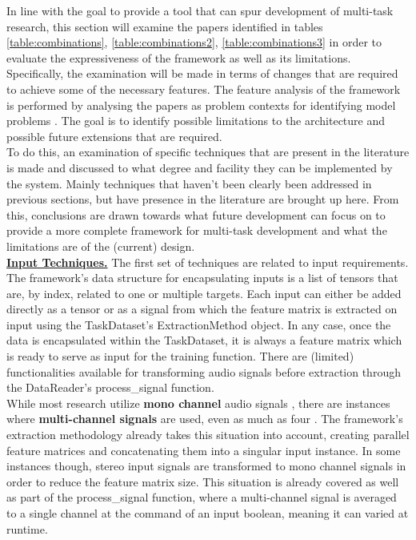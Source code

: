 
In line with the goal to provide a tool that can spur development of multi-task research, this section will examine the papers identified in tables \ref{table:combinations}, \ref{table:combinations2}, \ref{table:combinations3} in order to evaluate the expressiveness of the framework as well as its limitations. Specifically, the examination will be made in terms of changes that are required to achieve some of the necessary features. The feature analysis of the framework is performed by analysing the papers as problem contexts for identifying model problems \citep{brown1996framework}. The goal is to identify possible limitations to the architecture and possible future extensions that are required. \\

To do this, an examination of specific techniques that are present in the literature is made and discussed to what degree and facility they can be implemented by the system. Mainly techniques that haven't been clearly been addressed in previous sections, but have presence in the literature are brought up here. From this, conclusions are drawn towards what future development can focus on to provide a more complete framework for multi-task development and what the limitations are of the (current) design.\\



\underline{\textbf{Input Techniques.}} The first set of techniques are related to input requirements. The framework's data structure for encapsulating inputs is a list of tensors that are, by index, related to one or multiple targets. Each input can either be added directly as a tensor or as a signal from which the feature matrix is extracted on input using the TaskDataset's ExtractionMethod object. In any case, once the data is encapsulated within the TaskDataset, it is always a feature matrix which is ready to serve as input for the training function. There are (limited) functionalities available for transforming audio signals before extraction through the DataReader's process\_signal function.\\

While most research utilize \textbf{mono channel} audio signals \cite{seltzer2013multi} \cite{panchapagesan2016multi} \cite{kim2017speech}, there are instances where \textbf{multi-channel signals} are used, even as much as four \cite{nwe2017convolutional}. The framework's extraction methodology already takes this situation into account, creating parallel feature matrices and concatenating them into a singular input instance. In some instances though, stereo input signals are transformed to mono channel signals in order to reduce the feature matrix size. This situation is already covered as well as part of the process\_signal function, where a multi-channel signal is averaged to a single channel at the command of an input boolean, meaning it can varied at runtime.\\

